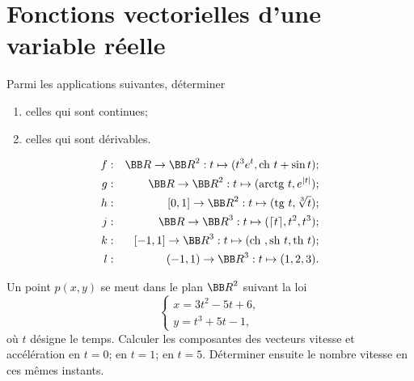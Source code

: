 \documentclass[12pt,french,oneside,a4paper]{memoir} %
\begin{document}
\chapter{Fonctions vectorielles d'une variable réelle}

\begin{exo}
Parmi les applications suivantes, déterminer
\begin{enumerate}
\item celles qui sont continues;
\item celles qui sont dérivables.
\end{enumerate}

\kern-4mm
\begin{eqnarray*}
f &:& {\BB R} \rightarrow {\BB R}^2 : t \mapsto (t^3e^t,\mbox{ch } t + \sin t); \\
g &:& {\BB R} \rightarrow {\BB R}^2 : t \mapsto (\mbox{arctg } t,e^{\vert t \vert}); \\
h &:& [0,1] \rightarrow {\BB R}^2 : t \mapsto (\mbox{tg } t, \sqrt[3]{t}); \\
j &:& {\BB R} \rightarrow {\BB R}^3 : t \mapsto (\lceil t \rceil,t^2,t^3); \\
k &:& [-1,1] \rightarrow {\BB R}^3 : t \mapsto (\mbox{ch }, \mbox{sh }t, \mbox{th }t); \\
l &:& (-1,1) \rightarrow {\BB R}^3 : t \mapsto (1,2,3).
\end{eqnarray*}
\end{exo}

\begin{exo}
Un point $p(x,y)$ se meut dans le plan ${\BB R}^2$ suivant la loi
\begin{equation*}
\left\{
\begin{array}{l}
x=3t^2-5t+6, \\
y=t^3+5t-1,
\end{array}
\right.
\end{equation*}
où $t$ désigne le temps. Calculer les composantes 
des vecteurs vitesse et accélération en $t=0$; en $t=1$; en $t=5$. Déterminer ensuite le nombre vitesse en ces mêmes instants.
\end{exo}
\end{document}
